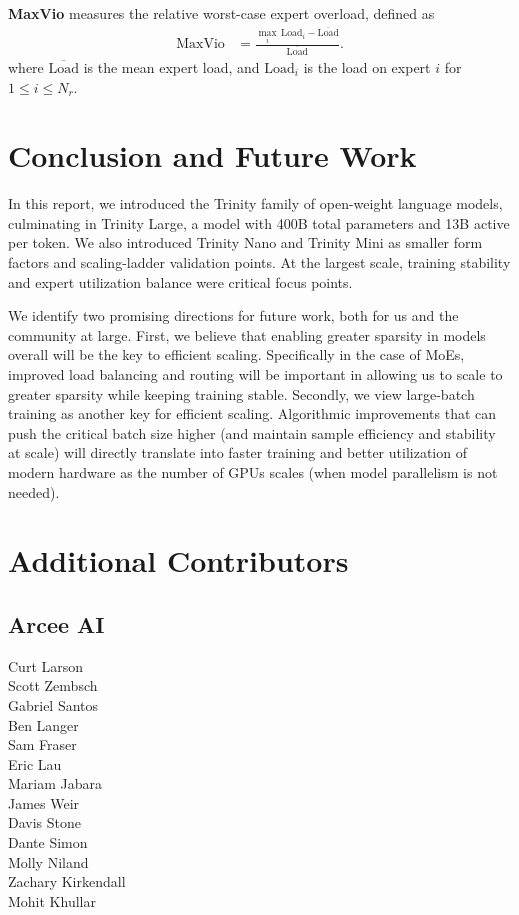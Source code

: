 \documentclass{article}
\begin{document}
\noindent\textbf{MaxVio} \citep{wang2024auxiliarylossfreeloadbalancingstrategy} measures the relative worst-case expert overload, defined as
\begin{align}
\mathrm{MaxVio}
&=
\frac{\max_{i}\,\mathrm{Load}_{i}-\overline{\mathrm{Load}}}{\overline{\mathrm{Load}}}.
\tag{42}
\end{align}
where $\overline{\mathrm{Load}}$ is the mean expert load, and $\mathrm{Load}_{i}$ is the load on expert $i$ for $1 \leq i \leq N_r$.

\newpage
\section{Conclusion and Future Work}

In this report, we introduced the Trinity family of open-weight language models, culminating in Trinity Large, a model with 400B total parameters and 13B active per token. We also introduced Trinity Nano and Trinity Mini as smaller form factors and scaling-ladder validation points. At the largest scale, training stability and expert utilization balance were critical focus points.

We identify two promising directions for future work, both for us and the community at large. First, we believe that enabling greater sparsity in models overall will be the key to efficient scaling. Specifically in the case of MoEs, improved load balancing and routing will be important in allowing us to scale to greater sparsity while keeping training stable. Secondly, we view large-batch training as another key for efficient scaling. Algorithmic improvements that can push the critical batch size higher (and maintain sample efficiency and stability at scale) will directly translate into faster training and better utilization of modern hardware as the number of GPUs scales (when model parallelism is not needed).

\newpage
\section*{Additional Contributors}
\subsection*{Arcee AI}
Curt Larson\\
Scott Zembsch\\
Gabriel Santos\\
Ben Langer\\
Sam Fraser\\
Eric Lau\\
Mariam Jabara\\
James Weir\\
Davis Stone\\
Dante Simon\\
Molly Niland\\
Zachary Kirkendall\\
Mohit Khullar
\end{document}
